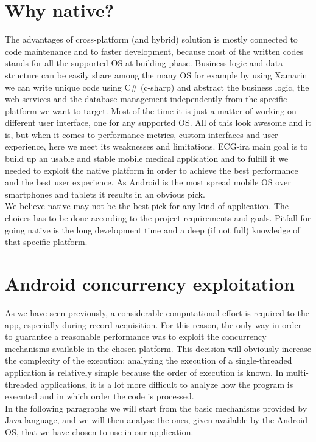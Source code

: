 \section{Why native?}
The advantages of cross-platform (and hybrid) solution is mostly connected to code maintenance and to faster development, because most of the written codes stands for all the supported OS at building phase. Business logic and data structure can be easily share among the many OS for example by using Xamarin we can write unique code using C\# (c-sharp) and abstract the business logic, the web services and the database management independently from the specific platform we want to target.  Most of the time it is just a matter of working on different user interface, one for any supported OS. All of this look awesome and it is, but when it comes to performance metrics, custom interfaces and user experience, here we meet its weaknesses and limitations. ECG-ira main goal is to build up an usable and stable mobile medical application and to fulfill it we needed to exploit the native platform in order to achieve the best performance and the best user experience. As Android is the most spread mobile OS over smartphones and tablets it results in an obvious pick.\\
We believe native may not be the best pick for any kind of application. The choices has to be done according to the project requirements and goals. Pitfall for going native is the long development time and a deep (if not full) knowledge of that specific platform.

\section{Android concurrency exploitation}
As we have seen previously, a considerable computational effort is required to the app, especially during record acquisition. For this reason, the only way in order to guarantee a reasonable performance was to exploit the concurrency mechanisms available in the chosen platform. This decision will obviously increase the complexity of the execution: analyzing the execution of a single-threaded application is relatively simple because the order of execution is known. In multi-threaded applications, it is a lot more difficult to analyze how the program is executed and in which order the code is processed.\\
In the following paragraphs we will start from the basic mechanisms provided by Java language, and we will then analyse the ones, given available by the Android OS, that we have chosen to use in our application.

